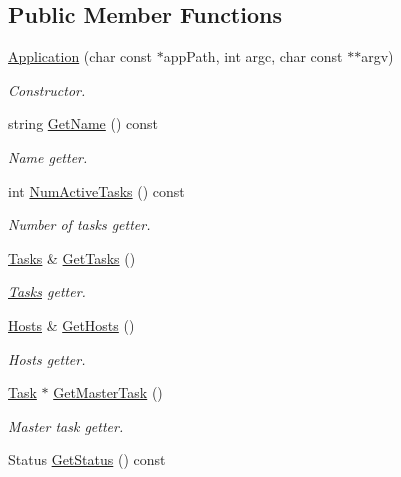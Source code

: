 \subsection*{Public Member Functions}
\begin{DoxyCompactItemize}
\item 
\hyperlink{class_model_1_1_application_a817618af167f7af002f1cbdf4d4c38b2}{Application} (char const $\ast$app\-Path, int argc, char const $\ast$$\ast$argv)
\begin{DoxyCompactList}\small\item\em Constructor. \end{DoxyCompactList}\item 
string \hyperlink{class_model_1_1_application_a9711ebdc4fb083bcd94f553fdda76fc6}{Get\-Name} () const 
\begin{DoxyCompactList}\small\item\em Name getter. \end{DoxyCompactList}\item 
int \hyperlink{class_model_1_1_application_a854cc5e17c6b50afe94ef9874390c43e}{Num\-Active\-Tasks} () const 
\begin{DoxyCompactList}\small\item\em Number of tasks getter. \end{DoxyCompactList}\item 
\hyperlink{class_model_1_1_tasks}{Tasks} \& \hyperlink{class_model_1_1_application_a1266983b65e6fde4203e8b224f1ed9ba}{Get\-Tasks} ()
\begin{DoxyCompactList}\small\item\em \hyperlink{class_model_1_1_tasks}{Tasks} getter. \end{DoxyCompactList}\item 
\hyperlink{classauto__vector}{Hosts} \& \hyperlink{class_model_1_1_application_ae8c12c9613d83d32302bf19908cf812a}{Get\-Hosts} ()
\begin{DoxyCompactList}\small\item\em Hosts getter. \end{DoxyCompactList}\item 
\hyperlink{class_model_1_1_task}{Task} $\ast$ \hyperlink{class_model_1_1_application_aeb0ce50463e62a7009a5d316c3d2feed}{Get\-Master\-Task} ()
\begin{DoxyCompactList}\small\item\em Master task getter. \end{DoxyCompactList}\item 
Status \hyperlink{class_model_1_1_application_afdc09d44cad811cfaa90a53dd1039247}{Get\-Status} () const 
$$
\end{DoxyCompactItemize}
